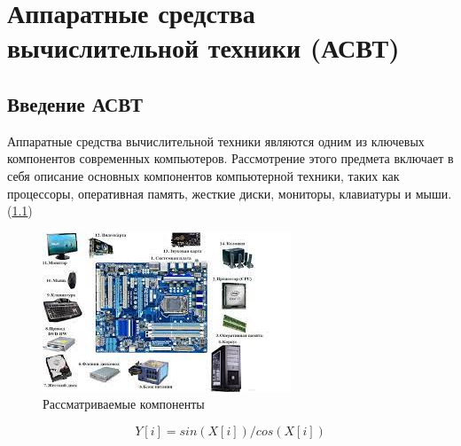 \documentclass[a4paper, 14pt]{report}
\begin{document}
	\chapter{Аппаратные средства вычислительной техники (АСВТ)}
	\section{Введение АСВТ}
	Аппаратные средства вычислительной техники являются одним из ключевых компонентов современных компьютеров. Рассмотрение этого предмета включает в себя описание основных компонентов компьютерной техники, таких как процессоры, оперативная память, жесткие диски, мониторы, клавиатуры и мыши.(\ref{cuda1})
	
	\begin{figure}[h]
		\centering
		\includegraphics[scale=0.7]{cudaOne}
		\caption{Рассматриваемые компоненты}
		\label{cuda1}
	\end{figure}
	
	\begin{equation}
		Y[i] = sin(X[i]) / cos(X[i])
		\label{costDgr}
	\end{equation}
	
	
	
	
	
\end{document}
